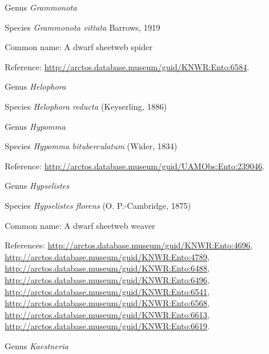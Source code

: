 \documentclass[9pt, article]{memoir}
\begin{document}
\begin{multicols}{2}
\vspace{6pt}\noindent\hspace{30pt}Genus \textit{Grammonota}


\vspace{6pt}\noindent\hspace{36pt}Species \textit{Grammonota vittata} Barrows, 1919


Common name: A dwarf sheetweb spider

Reference: 
\url{http://arctos.database.museum/guid/KNWR:Ento:6584}.

\vspace{6pt}\noindent\hspace{30pt}Genus \textit{Helophora}


\vspace{6pt}\noindent\hspace{36pt}Species \textit{Helophora reducta} (Keyserling, 1886)


\vspace{6pt}\noindent\hspace{30pt}Genus \textit{Hypomma}


\vspace{6pt}\noindent\hspace{36pt}Species \textit{Hypomma bituberculatum} (Wider, 1834)


Reference: 
\url{http://arctos.database.museum/guid/UAMObs:Ento:239046}.

\vspace{6pt}\noindent\hspace{30pt}Genus \textit{Hypselistes}


\vspace{6pt}\noindent\hspace{36pt}Species \textit{Hypselistes florens} (O. P.-Cambridge, 1875)


Common name: A dwarf sheetweb weaver

References: 
\url{http://arctos.database.museum/guid/KNWR:Ento:4696}, 
\url{http://arctos.database.museum/guid/KNWR:Ento:4789}, 
\url{http://arctos.database.museum/guid/KNWR:Ento:6488}, 
\url{http://arctos.database.museum/guid/KNWR:Ento:6496}, 
\url{http://arctos.database.museum/guid/KNWR:Ento:6541}, 
\url{http://arctos.database.museum/guid/KNWR:Ento:6568}, 
\url{http://arctos.database.museum/guid/KNWR:Ento:6613}, 
\url{http://arctos.database.museum/guid/KNWR:Ento:6619}.

\vspace{6pt}\noindent\hspace{30pt}Genus \textit{Kaestneria}



\end{multicols}
\end{document}
